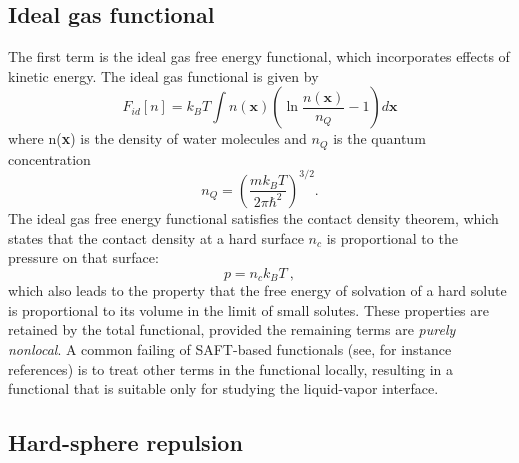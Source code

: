 \documentclass[letterpaper,twocolumn,amsmath,amssymb,prb]{revtex4-1}
\newcommand{\xx}{\textbf{x}}
\begin{document}
\subsection{Ideal gas functional}
The first term is the ideal gas free energy functional, which
incorporates effects of kinetic energy.  The ideal gas functional is
given by
\begin{equation}\label{idealgas}
  F_{id}[n] = k_B T \int n(\xx)\left( \ln{\frac{n(\xx)}{n_Q}} - 1\right) d\xx
\end{equation}
where n(\xx) is the density of water molecules and $n_Q$ is the
quantum concentration
\begin{equation}\label{quantumconcentration}
 n_Q =\left(\frac{mk_BT}{2\pi\hbar^2}\right)^{3/2}.
\end{equation}
The ideal gas free energy functional satisfies the contact density
theorem, which states that the contact density at a hard surface $n_c$
is proportional to the pressure on that surface:
\begin{equation}\label{contactvaluethm}
  p = n_c k_BT \:,
\end{equation}
which also leads to the property that the free energy of solvation of
a hard solute is proportional to its volume in the limit of small
solutes.  These properties are retained by the total functional,
provided the remaining terms are \emph{purely nonlocal}.  A common
failing of SAFT-based functionals (see, for instance
references\cite{felipe2001examination, gloor2002saft,
  gloor2004accurate, clark2006developing, gloor2007prediction,
  kahl2008modified, gross2009density}) is to treat other terms in the
functional locally, resulting in a functional that is suitable only
for studying the liquid-vapor interface.


\subsection{Hard-sphere repulsion}
\end{document}

